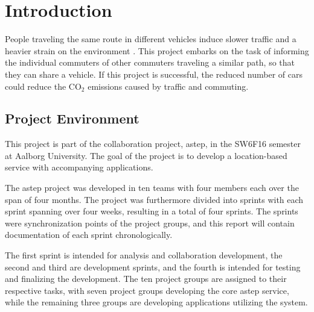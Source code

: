\chapter{Introduction}\label{ch:introduction}


People traveling the same route in different vehicles induce slower traffic and a heavier strain on the environment \cite{trafficJam}\cite{trafficEmissions}.
This project embarks on the task of informing the individual commuters of other commuters traveling a similar path, so that they can share a vehicle.
If this project is successful, the reduced number of cars could reduce the CO$_2$ emissions caused by traffic and commuting.

\section{Project Environment}
This project is part of the collaboration project, \gls{astep}, in the SW6F16 semester at Aalborg University.
The goal of the project is to develop a location-based service with accompanying applications. 

The \gls{astep} project was developed in ten teams with four members each over the span of four months.
The project was furthermore divided into sprints with each sprint spanning over four weeks, resulting in a total of four sprints.
The sprints were synchronization points of the project groups, and this report will contain documentation of each sprint chronologically.

The first sprint is intended for analysis and collaboration development, the second and third are development sprints, and the fourth is intended for testing and finalizing the development.
The ten project groups are assigned to their respective tasks, with seven project groups developing the core \gls{astep} service, while the remaining three groups are developing applications utilizing the system.



